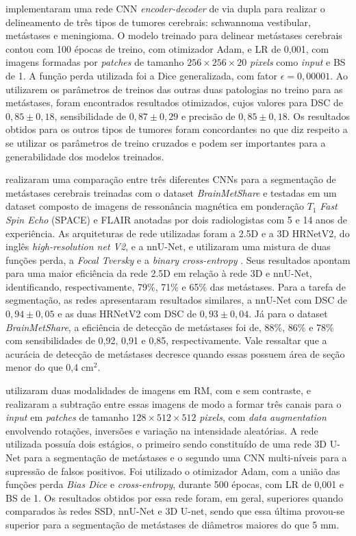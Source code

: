 \cite{Lee:2022} implementaram uma rede CNN \textit{encoder-decoder} de via dupla para realizar o delineamento de três tipos de tumores cerebrais: schwannoma vestibular, metástases e meningioma. O modelo treinado para delinear metástases cerebrais contou com 100 épocas de treino, com otimizador Adam, e LR de 0,001, com imagens formadas por \textit{patches} de tamanho $256\times256\times20$ \textit{pixels} como \textit{input} e BS de 1. A função perda utilizada foi a Dice generalizada, com fator $\epsilon = 0,00001$. Ao utilizarem os parâmetros de treinos das outras duas patologias no treino para as metástases, foram encontrados resultados otimizados, cujos valores para DSC de $0,85 \pm 0,18$, sensibilidade de $0,87 \pm 0,29$ e precisão de $0,85 \pm 0,18$. Os resultados obtidos para os outros tipos de tumores foram concordantes no que diz respeito a se utilizar os parâmetros de treino cruzados e podem ser importantes para a generabilidade dos modelos treinados.

\cite{Ottesen:2023} realizaram uma comparação entre três diferentes CNNs para a segmentação de metástases cerebrais treinadas com o dataset \textit{BrainMetShare} e testadas em um dataset composto de imagens de ressonância magnética em ponderação $T_1$ \textit{Fast Spin Echo} (SPACE) e FLAIR anotadas por dois radiologistas com 5 e 14 anos de experiência. As arquiteturas de rede utilizadas foram a 2.5D e a 3D HRNetV2, do inglês \textit{high-resolution net V2}, e a nnU-Net, e utilizaram uma mistura de duas funções perda, a \textit{Focal Tversky} e a \textit{binary cross-entropy} . Seus resultados apontam para uma maior eficiência da rede 2.5D em relação à rede 3D e nnU-Net, identificando, respectivamente, 79\%, 71\% e 65\% das metástases. Para a tarefa de segmentação, as redes apresentaram resultados similares, a nnU-Net com DSC de $0,94 \pm 0,05$ e as duas HRNetV2 com DSC de $0,93 \pm 0,04$. Já para o dataset \textit{BrainMetShare}, a eficiência de detecção de metástases foi de, 88\%, 86\% e 78\% com sensibilidades de 0,92, 0,91 e 0,85, respectivamente. Vale ressaltar que a acurácia de detecção de metástases decresce quando essas possuem área de seção menor do que 0,4 cm$^2$.

\cite{Li:2023} utilizaram duas modalidades de imagens em RM, com e sem contraste, e realizaram a subtração entre essas imagens de modo a formar três canais para o \textit{input} em \textit{patches} de tamanho $128\times512\times512$ \textit{pixels}, com \textit{data augmentation} envolvendo rotações, inversões e variação na intensidade aleatórias. A rede utilizada possuía dois estágios, o primeiro sendo constituído de uma rede 3D U-Net para a segmentação de metástases e o segundo uma CNN multi-níveis para a supressão de falsos positivos. Foi utilizado o otimizador Adam, com a união das funções perda \textit{Bias Dice} e \textit{cross-entropy}, durante 500 épocas, com LR de 0,001 e BS de 1. Os resultados obtidos por essa rede foram, em geral, superiores quando comparados às redes SSD, nnU-Net e 3D U-net, sendo que essa última provou-se superior para a segmentação de metástases de diâmetros maiores do que 5 mm.

